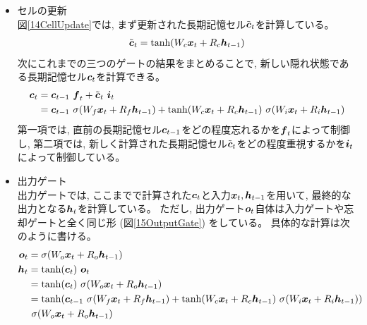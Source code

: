 \begin{itemize}
  \item セルの更新\\
  図\ref{14CellUpdate}では, まず更新された長期記憶セル$\tilde{{\mbox{\boldmath{$c$}}}}_t$を計算している。
\begin{equation}
 \begin{split}
  \tilde{{\mbox{\boldmath{$c$}}}}_t = \tanh (W_c {\mbox{\boldmath{$x$}}}_t + R_c {\mbox{\boldmath{$h$}}}_{t-1})
 \end{split}
\end{equation} 
  次にこれまでの三つのゲートの結果をまとめることで, 新しい隠れ状態である長期記憶セル${\mbox{\boldmath{$c$}}}_{t}$を計算できる。
\begin{equation}
 \begin{split}
  {\mbox{\boldmath{$c$}}}_{t} 
  &= {\mbox{\boldmath{$c$}}}_{t-1} \  {\mbox{\boldmath{$f$}}}_{t} + \tilde{\mbox{\boldmath{$c$}}}_{t}\ {\mbox{\boldmath{$i$}}}_{t}\\
  &= {\mbox{\boldmath{$c$}}}_{t-1} \  \sigma (W_f {\mbox{\boldmath{$x$}}}_t + R_f {\mbox{\boldmath{$h$}}}_{t-1}) 
  + \tanh (W_c {\mbox{\boldmath{$x$}}}_t + R_c {\mbox{\boldmath{$h$}}}_{t-1}) \  \sigma (W_i {\mbox{\boldmath{$x$}}}_t + R_i {\mbox{\boldmath{$h$}}}_{t-1})
 \end{split}
\end{equation}
  第一項では, 直前の長期記憶セル${\mbox{\boldmath{$c$}}}_{t-1}$をどの程度忘れるかを${\mbox{\boldmath{$f$}}}_{t}$によって制御し, 第二項では, 新しく計算された長期記憶セル$\tilde{\mbox{\boldmath{$c$}}}_{t}$をどの程度重視するかを${\mbox{\boldmath{$i$}}}_{t}$によって制御している。
    
  \item 出力ゲート\\
  出力ゲートでは, ここまでで計算された${\mbox{\boldmath{$c$}}}_{t}$と入力${\mbox{\boldmath{$x$}}}_t, {\mbox{\boldmath{$h$}}}_{t-1}$を用いて, 最終的な出力となる${\mbox{\boldmath{$h$}}}_{t}$を計算している。
  ただし, 出力ゲート${\mbox{\boldmath{$o$}}}_{t}$自体は入力ゲートや忘却ゲートと全く同じ形 (図\ref{15OutputGate}) をしている。
  具体的な計算は次のように書ける。
\begin{equation}
 \begin{split}
  {\mbox{\boldmath{$o$}}}_{t} 
  &= \sigma (W_o {\mbox{\boldmath{$x$}}}_t + R_o {\mbox{\boldmath{$h$}}}_{t-1})\\
  {\mbox{\boldmath{$h$}}}_{t} 
  &= \tanh({\mbox{\boldmath{$c$}}}_{t}) \  {\mbox{\boldmath{$o$}}}_{t}\\
  &= \tanh({\mbox{\boldmath{$c$}}}_{t}) \  \sigma (W_o {\mbox{\boldmath{$x$}}}_t + R_o {\mbox{\boldmath{$h$}}}_{t-1})\\
  &= \tanh({\mbox{\boldmath{$c$}}}_{t-1} \  \sigma (W_f {\mbox{\boldmath{$x$}}}_t + R_f {\mbox{\boldmath{$h$}}}_{t-1}) 
  + \tanh (W_c {\mbox{\boldmath{$x$}}}_t + R_c {\mbox{\boldmath{$h$}}}_{t-1}) \  \sigma (W_i {\mbox{\boldmath{$x$}}}_t + R_i {\mbox{\boldmath{$h$}}}_{t-1})) \\
  &\  \sigma (W_o {\mbox{\boldmath{$x$}}}_t + R_o {\mbox{\boldmath{$h$}}}_{t-1})
 \end{split}
\end{equation}
\end{itemize}


